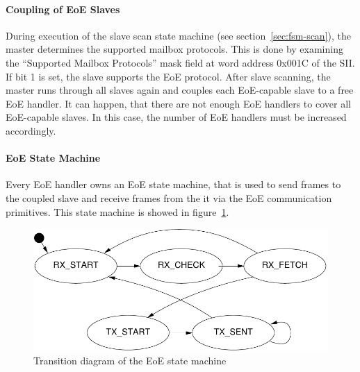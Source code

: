 \documentclass[a4paper,12pt,BCOR6mm,bibtotoc,idxtotoc]{scrbook}
\begin{document}
\paragraph{Coupling of EoE Slaves}

During execution of the slave scan state machine (see
section~\ref{sec:fsm-scan}), the master determines the supported
mailbox protocols. This is done by examining the ``Supported Mailbox
Protocols'' mask field at word address 0x001C of the SII.
If bit 1 is set, the slave supports the EoE protocol. After slave
scanning, the master runs through all slaves again and couples each
EoE-capable slave to a free EoE handler. It can happen, that there are
not enough EoE handlers to cover all EoE-capable slaves. In this case,
the number of EoE handlers must be increased accordingly.

\paragraph{EoE State Machine}

Every EoE handler owns an EoE state machine, that is used to send
frames to the coupled slave and receive frames from the it via the EoE
communication primitives. This state machine is showed in
figure~\ref{fig:fsm-eoe}.

\begin{figure}[htbp]
  \centering
  \includegraphics[width=.7\textwidth]{images/fsm-eoe}
  \caption{Transition diagram of the EoE state machine}
  \label{fig:fsm-eoe}
\end{figure}
\end{document}
